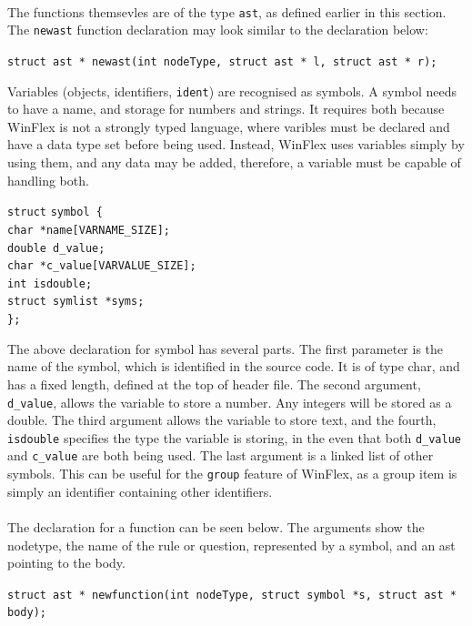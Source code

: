 \documentclass[12pt]{report}
\begin{document}
\\
The functions themsevles are of the type \texttt{ast}, as defined earlier in this section.  The \texttt{newast} function declaration may look similar to the declaration below:
\begin{center}
\texttt{struct ast * newast(int nodeType, struct ast * l, struct ast * r);}\\
\end{center}
Variables (objects, identifiers, \texttt{ident}) are recognised as symbols.  A symbol needs to have a name, and storage for numbers and strings.  It requires both because WinFlex is not a strongly typed language, where varibles must be declared and have a data type set before being used.  Instead, WinFlex uses variables simply by using them, and any data may be added, therefore, a variable must be capable of handling both.
\begin{tabbing}
	\texttt{struct} \= \texttt{symbol \{}\\
	\> \texttt{char *name[VARNAME\_SIZE];}\\
	\> \texttt{double d\_value;}\\
	\> \texttt{char *c\_value[VARVALUE\_SIZE];}\\
	\> \texttt{int isdouble;}\\
	\> \texttt{struct symlist *syms;}\\
	\texttt{\};}\\
\end{tabbing}
The above declaration for symbol has several parts.  The first parameter is the name of the symbol, which is identified in the source code.  It is of type char, and has a fixed length, defined at the top of header file.  The second argument, \texttt{d\_value}, allows the variable to store a number.  Any integers will be stored as a double.  The third argument allows the variable to store text, and the fourth, \texttt{isdouble} specifies the type the variable is storing, in the even that both \texttt{d\_value} and \texttt{c\_value} are both being used.  The last argument is a linked list of other symbols.  This can be useful for the \texttt{group} feature of WinFlex, as a group item is simply an identifier containing other identifiers.\\
\\
The declaration for a function can be seen below.  The arguments show the nodetype, the name of the rule or question, represented by a symbol, and an ast pointing to the body.
\begin{center}
\texttt{struct ast * newfunction(int nodeType, struct symbol *s, struct ast * body);}\\
\end{center}
\end{document}
